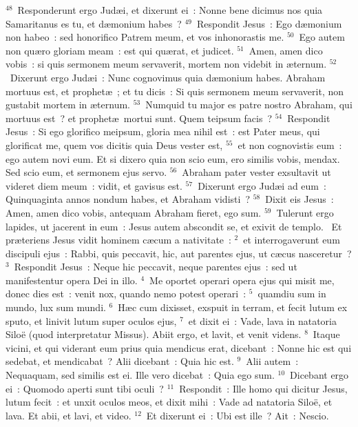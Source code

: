 ${}^{48}$~Responderunt ergo Jud\ae i, et dixerunt ei~: Nonne bene dicimus nos quia Samaritanus es tu, et d\ae monium habes~?
${}^{49}$~Respondit Jesus~: Ego d\ae monium non habeo~: sed honorifico Patrem meum, et vos inhonorastis me.
${}^{50}$~Ego autem non qu\ae ro gloriam meam~: est qui qu\ae rat, et judicet.
${}^{51}$~Amen, amen dico vobis~: si quis sermonem meum servaverit, mortem non videbit in \ae ternum.
${}^{52}$~Dixerunt ergo Jud\ae i~: Nunc cognovimus quia d\ae monium habes. Abraham mortuus est, et prophet\ae~; et tu dicis~: Si quis sermonem meum servaverit, non gustabit mortem in \ae ternum.
${}^{53}$~Numquid tu major es patre nostro Abraham, qui mortuus est~? et prophet\ae\ mortui sunt. Quem teipsum facis~?
${}^{54}$~Respondit Jesus~: Si ego glorifico meipsum, gloria mea nihil est~: est Pater meus, qui glorificat me, quem vos dicitis quia Deus vester est,
${}^{55}$~et non cognovistis eum~: ego autem novi eum. Et si dixero quia non scio eum, ero similis vobis, mendax. Sed scio eum, et sermonem ejus servo.
${}^{56}$~Abraham pater vester exsultavit ut videret diem meum~: vidit, et gavisus est.
${}^{57}$~Dixerunt ergo Jud\ae i ad eum~: Quinquaginta annos nondum habes, et Abraham vidisti~?
${}^{58}$~Dixit eis Jesus~: Amen, amen dico vobis, antequam Abraham fieret, ego sum.
${}^{59}$~Tulerunt ergo lapides, ut jacerent in eum~: Jesus autem abscondit se, et exivit de templo.
~Et pr\ae teriens Jesus vidit hominem c\ae cum a nativitate~:
${}^{2}$~et interrogaverunt eum discipuli ejus~: Rabbi, quis peccavit, hic, aut parentes ejus, ut c\ae cus nasceretur~?
${}^{3}$~Respondit Jesus~: Neque hic peccavit, neque parentes ejus~: sed ut manifestentur opera Dei in illo.
${}^{4}$~Me oportet operari opera ejus qui misit me, donec dies est~: venit nox, quando nemo potest operari~:
${}^{5}$~quamdiu sum in mundo, lux sum mundi.
${}^{6}$~H\ae c cum dixisset, exspuit in terram, et fecit lutum ex sputo, et linivit lutum super oculos ejus,
${}^{7}$~et dixit ei~: Vade, lava in natatoria Silo\"e (quod interpretatur Missus). Abiit ergo, et lavit, et venit videns.
${}^{8}$~Itaque vicini, et qui viderant eum prius quia mendicus erat, dicebant~: Nonne hic est qui sedebat, et mendicabat~? Alii dicebant~: Quia hic est.
${}^{9}$~Alii autem~: Nequaquam, sed similis est ei. Ille vero dicebat~: Quia ego sum.
${}^{10}$~Dicebant ergo ei~: Quomodo aperti sunt tibi oculi~?
${}^{11}$~Respondit~: Ille homo qui dicitur Jesus, lutum fecit~: et unxit oculos meos, et dixit mihi~: Vade ad natatoria Silo\"e, et lava. Et abii, et lavi, et video.
${}^{12}$~Et dixerunt ei~: Ubi est ille~? Ait~: Nescio.


